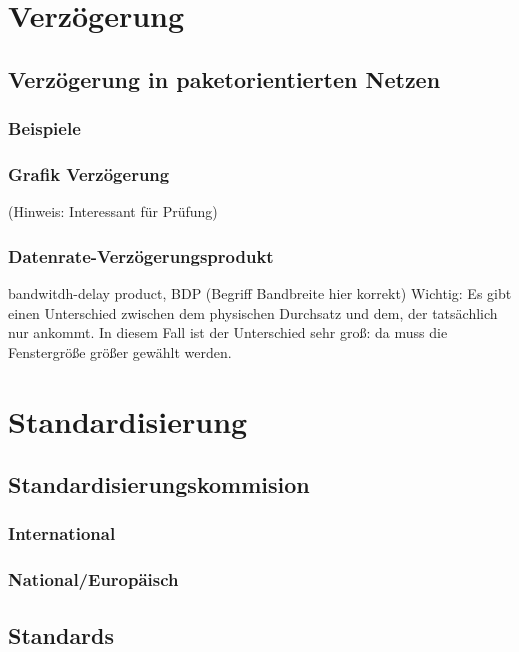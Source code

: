 \section{Verzögerung}

\subsection{Verzögerung in paketorientierten Netzen}

\subsubsection*{Beispiele}

\subsubsection*{Grafik Verzögerung}
(Hinweis: Interessant für Prüfung)

\subsubsection{Datenrate-Verzögerungsprodukt}
bandwitdh-delay product, BDP (Begriff Bandbreite hier korrekt)
Wichtig: Es gibt einen Unterschied zwischen dem physischen Durchsatz und dem, der tatsächlich nur ankommt. In diesem Fall ist der Unterschied sehr groß: da muss die Fenstergröße größer gewählt werden.

\section{Standardisierung}
\subsection{Standardisierungskommision}
\subsubsection{International}
\subsubsection{National/Europäisch}
\subsection{Standards}

